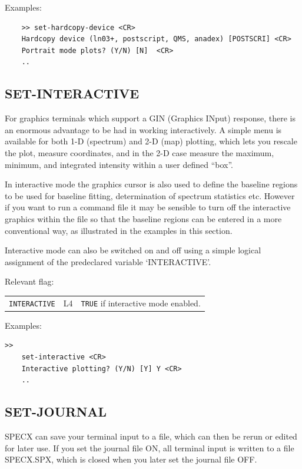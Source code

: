 \documentclass[11pt,twoside]{report}
\begin{document}
Examples:
\begin{verbatim}
    >> set-hardcopy-device <CR>
    Hardcopy device (ln03+, postscript, QMS, anadex) [POSTSCRI] <CR>
    Portrait mode plots? (Y/N) [N]  <CR>
    ..
\end{verbatim}

\subsection{SET-INTERACTIVE} 

For graphics terminals which support a GIN (Graphics INput) response,
there is an enormous advantage to be had in working interactively. A
simple menu is available for both 1-D (spectrum) and 2-D (map) plotting,
which lets you rescale the plot, measure coordinates, and in the 2-D case
measure the maximum, minimum, and integrated intensity within a user
defined ``box''.

In interactive mode the graphics cursor is also used to define the baseline
regions to be used for baseline fitting, determination of spectrum 
statistics etc. However if you want to run a command file it may be sensible
to turn off the interactive graphics within the file so that the baseline
regions can be entered in a more conventional way, as illustrated in the 
examples in this section.

Interactive mode can also be switched on and off using a simple logical
assignment of the predeclared variable `INTERACTIVE'.

Relevant flag:
\begin{tabular}{lll}
   \verb+INTERACTIVE+ & L4 & \verb$TRUE$ if interactive mode enabled.
\end{tabular}

Examples:
\begin{verbatim}
>> 
    set-interactive <CR>
    Interactive plotting? (Y/N) [Y] Y <CR>
    ..
\end{verbatim}

\subsection{SET-JOURNAL} 

SPECX can save your terminal input to a file, which can then be rerun or edited
for later use. If you set the journal file ON, all terminal input is written to
a file SPECX.SPX,  which is closed when you later set the
journal file OFF. 
\end{document}
